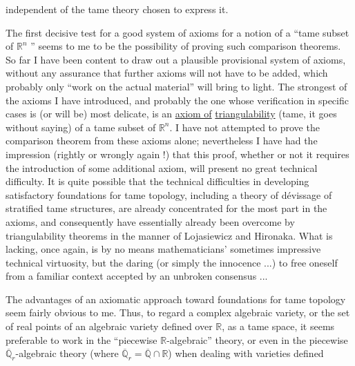 
independent of the tame theory chosen to express
it.

The first decisive test for a good system of axioms
for a notion of a ``tame subset of $\mathbb{R}^n$ '' seems to me to be the possibility
of proving such comparison theorems. So far I have
been content to draw out a plausible provisional system of axioms,
without any assurance that further axioms will not have to be
added, which probably only ``work on the actual material''
will bring to light. The strongest of the axioms I have
introduced, and probably the one whose verification in specific
cases is (or will be) most delicate, is an \uline{axiom of}
\uline{triangulability} (tame, it goes without saying) of a tame subset of $\mathbb{R}^n$.
I have not attempted to prove the comparison theorem from these axioms
alone; nevertheless I have had the impression (rightly
or wrongly again !) that this proof, whether or not it requires
the introduction of some additional axiom, will present
no great technical difficulty. It is quite possible
that the technical difficulties in developing
satisfactory foundations for tame topology, including a
theory of dévissage of stratified tame structures, are
already concentrated for the most part in the axioms, and consequently
have essentially already been overcome by triangulability
theorems in the manner of Lojasiewicz and Hironaka. What is lacking,
once again, is by no means mathematicians' sometimes impressive
technical virtuosity, but the daring (or simply
the innocence ...) to free oneself from a familiar context
accepted by an unbroken consensus ...

The advantages of an axiomatic approach toward foundations
for tame topology seem fairly obvious to me. Thus,
to regard a complex algebraic variety, or the set of
real points of an algebraic variety defined over $\mathbb{R}$, as a
tame space, it seems preferable to work in the
``piecewise $\mathbb{R}$-algebraic'' theory, or even in the piecewise $\overline{\mathbb{Q}}_r$-algebraic
theory (where $\overline{\mathbb{Q}}_r = \overline{\mathbb{Q}} \cap \mathbb{R}$) when dealing with varieties defined


